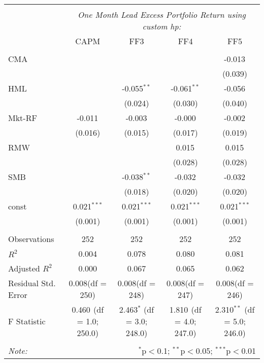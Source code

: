 \begin{table}[!htbp] \centering
\begin{tabular}{@{\extracolsep{5pt}}lcccc}
\\[-1.8ex]\hline
\hline \\[-1.8ex]
& \multicolumn{4}{c}{\textit{One Month Lead Excess Portfolio Return using custom hp:}} \
\cr \cline{4-5}
\\[-1.8ex] & CAPM & FF3 & FF4 & FF5 \\
\hline \\[-1.8ex]
 CMA & & & & -0.013$^{}$ \\
  & & & & (0.039) \\
 HML & & -0.055$^{**}$ & -0.061$^{**}$ & -0.056$^{}$ \\
  & & (0.024) & (0.030) & (0.040) \\
 Mkt-RF & -0.011$^{}$ & -0.003$^{}$ & -0.000$^{}$ & -0.002$^{}$ \\
  & (0.016) & (0.015) & (0.017) & (0.019) \\
 RMW & & & 0.015$^{}$ & 0.015$^{}$ \\
  & & & (0.028) & (0.028) \\
 SMB & & -0.038$^{**}$ & -0.032$^{}$ & -0.032$^{}$ \\
  & & (0.018) & (0.020) & (0.020) \\
 const & 0.021$^{***}$ & 0.021$^{***}$ & 0.021$^{***}$ & 0.021$^{***}$ \\
  & (0.001) & (0.001) & (0.001) & (0.001) \\
\hline \\[-1.8ex]
 Observations & 252 & 252 & 252 & 252 \\
 $R^2$ & 0.004 & 0.078 & 0.080 & 0.081 \\
 Adjusted $R^2$ & 0.000 & 0.067 & 0.065 & 0.062 \\
 Residual Std. Error & 0.008(df = 250) & 0.008(df = 248) & 0.008(df = 247) & 0.008(df = 246)  \\
 F Statistic & 0.460$^{}$ (df = 1.0; 250.0) & 2.463$^{*}$ (df = 3.0; 248.0) & 1.810$^{}$ (df = 4.0; 247.0) & 2.310$^{**}$ (df = 5.0; 246.0) \\
\hline
\hline \\[-1.8ex]
\textit{Note:} & \multicolumn{4}{r}{$^{*}$p$<$0.1; $^{**}$p$<$0.05; $^{***}$p$<$0.01} \\
\end{tabular}
\end{table}
